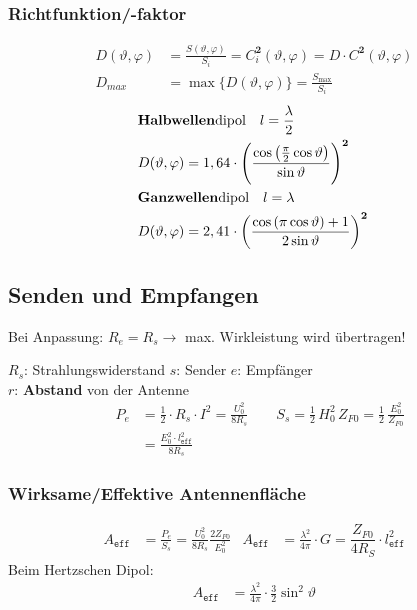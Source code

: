 \subsubsection{Richtfunktion/-faktor}
\begin{align*}
    D(\vartheta, \varphi) & = \frac{S(\vartheta, \varphi)}{S_{i}} = C^\mathbf{2}_i(\vartheta, \varphi) = D \cdot C^\mathbf{2}(\vartheta, \varphi) &\\
    D_{max} & = \max \{D(\vartheta, \varphi)\} = \frac{S_{\max}}{S_{i}}&
\end{align*}
\vspace{-0.5cm}
\begin{align*}
	&\text{\textbf{Halbwellen}dipol}\quad l=\frac{\lambda}{2}\\
	&D(\vartheta, \varphi) = 1,64 \cdot  
	\left(\frac{\cos\left(\frac{\pi}{2}\cos\vartheta\right)}{\sin\vartheta}\right)^\mathbf{2}&\\
	&\text{\textbf{Ganzwellen}dipol}\quad l=\lambda\\ &D(\vartheta, \varphi) = 2,41 \cdot
	\left(\frac{\cos\left(\pi\cos\vartheta\right)+1}{2\sin\vartheta}\right)^\mathbf{2}&
\end{align*}

\subsection{Senden und Empfangen}
Bei Anpassung: $R_e = R_s \rightarrow$ max. Wirkleistung wird übertragen!


$ R_s $: Strahlungswiderstand \quad $ s $: Sender \qquad $ e $: Empfänger\\
$ r $: \textbf{Abstand} von der Antenne
\begin{align*}
	P_e &= \frac{1}{2}\cdot R_s \cdot I^2 = \frac{U_0^2}{8R_{s}} \qquad S_s = \frac{1}{2}\, H_0^2 \, Z_{F0} = \frac{1}{2} \, \frac{E_0^2}{Z_{F0}}  \\
	&= \frac{E_0^2\cdot l^2_{\mathtt{eff}}}{8R_{s}}
\end{align*}
\subsubsection{Wirksame/Effektive Antennenfläche}
\begin{align*}
	A_\texttt{eff} & = \frac{P_e}{S_s} = \frac{U_0^2}{8R_{s}}\frac{2Z_{F0}}{E_0^2} &
	A_\texttt{eff} & = \frac{\lambda^2}{4\pi}\cdot G = \dfrac{Z_{F0}}{4 R_S} \cdot l_\texttt{eff}^2&
\end{align*}
Beim Hertzschen Dipol:
\begin{align*}
	A_\texttt{eff} & =  \frac{\lambda^2}{4\pi}\cdot\frac{3}{2}\sin^2\vartheta &
\end{align*}
